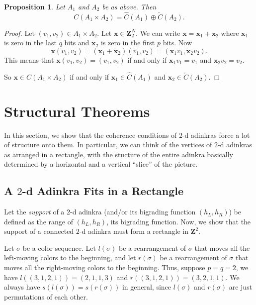 \documentclass[12pt,twoside,singlespace]{article}
\numberwithin{equation}{section}
\newtheorem{prop}[equation]{Proposition}
\theoremstyle{definition}
\newcommand{\ZZ}{\mathbf{Z}}
\renewcommand{\vec}[1]{\mathbf{#1}}
\begin{document}
\begin{prop}
Let $A_1$ and $A_2$ be as above.  Then
\[C(A_1\times A_2)=\hat{C}(A_1)\oplus \check{C}(A_2).\]
\end{prop}
\begin{proof}
Let $(v_1,v_2)\in A_1\times A_2$.  Let $\vec{x}\in \ZZ_2^N$.  We can write $\vec{x}=\vec{x}_1+\vec{x}_2$ where $\vec{x}_1$ is zero in the last $q$ bits and $\vec{x}_2$ is zero in the first $p$ bits.  Now
\[\vec{x}(v_1,v_2)=(\vec{x}_1+\vec{x}_2)(v_1,v_2)=(\vec{x}_1v_1,\vec{x}_2v_2).\]
This means that $\vec{x}(v_1,v_2)=(v_1,v_2)$ if and only if $\vec{x}_1v_1=v_1$ and $\vec{x}_2 v_2=v_2$.

So $\vec{x}\in C(A_1\times A_2)$ if and only if $\vec{x}_1\in \hat{C}(A_1)$ and $\vec{x}_2\in \check{C}(A_2)$.
\end{proof}



\section{Structural Theorems}

In this section, we show that the coherence conditions of $2$-d adinkras force a lot of structure onto them. In particular, we can think of the vertices of $2$-d adinkras as arranged in a rectangle, with the stucture of the entire adinkra basically determined by a horizontal and a vertical ``slice'' of the picture.

\subsection{A $2$-d Adinkra Fits in a Rectangle}

Let the \emph{support} of a $2$-d adinkra (and/or its bigrading function $(h_L,h_R)$) be defined as the range of $(h_L,h_R)$, its bigrading function. Now, we show that the support of a connected $2$-d adinkra must form a rectangle in $\ZZ^2$.

Let $\sigma$ be a color sequence.  Let $l(\sigma)$ be a rearrangement of $\sigma$ that moves all the left-moving colors to the beginning, and let $r(\sigma)$ be a rearrangement of $\sigma$ that moves all the right-moving colors to the beginning. Thus, suppose $p = q = 2$, we have $l((3,1,2,1)) = (2,1,1,3)$ and $r((3,1,2,1)) = (3,2,1,1)$. We always have $s(l(\sigma)) = s(r(\sigma))$ in general, since $l(\sigma)$ and $r(\sigma)$ are just permutations of each other.
\end{document}
